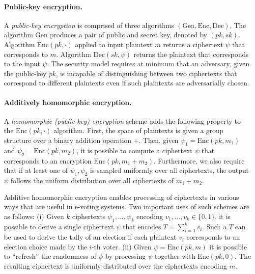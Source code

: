 \paragraph{Public-key encryption.} A \emph{public-key encryption} is
comprised of three algorithms
$(\mathrm{Gen},\mathrm{Enc}, \mathrm{Dec})$. The algorithm
$\mathrm{Gen}$ produces a pair of public and secret key, denoted by
$(pk,sk)$. Algorithm $\mathrm{Enc}(pk, \cdot )$ applied to input
plaintext $m$ returns a ciphertext $\psi$ that corresponds to $m$.
Algorithm $\mathrm{Dec}(sk, \psi )$ returns the plaintext that
corresponds to the input $\psi$. The security model requires at
minimum that an adversary, given the public-key $pk$, is incapable of
distinguishing between two ciphertexts that correspond to different
plaintexts even if such plaintexts are adversarially chosen.

\paragraph{Additively homomorphic encryption.} A \emph{homomorphic
  (public-key) encryption} scheme adds the following property to the
$\mathrm{Enc}(pk, \cdot)$ algorithm. First, the space of plaintexts is
given a group structure over a binary addition operation $+$. Then,
given $\psi_1 = \mathrm{Enc}(pk, m_1)$ and
$\psi_2 = \mathrm{Enc}(pk, m_2)$, it is possible to compute a
ciphertext $\psi$ that corresponds to an encryption
$\mathrm{Enc}(pk, m_1 + m_2)$. Furthermore, we also require that if at
least one of $\psi_1, \psi_2$ is sampled uniformly over all
ciphertexts, the output $\psi$ follows the uniform distribution over
all ciphertexts of $m_1 + m_2$.

Additive homomorphic encryption enables processing of ciphertexts in
various ways that are useful in e-voting systems. Two important uses
of such schemes are as follows: (i) Given $k$ ciphertexts
$\psi_1, \ldots, \psi_k$ encoding $v_1, \ldots, v_k \in \{0,1\}$, it
is possible to derive a single ciphertext $\psi$ that encodes
$T= \sum^k_{i=1} v_i$. Such a $T$ can be used to derive the tally of
an election if each plaintext $v_i$ corresponds to an election choice
made by the $i$-th voter. (ii) Given $\psi = \mathrm{Enc}(pk, m)$ it
is possible to ``refresh'' the randomness of $\psi$ by processing
$\psi$ together with $\mathrm{Enc}(pk, 0)$. The resulting ciphertext
is uniformly distributed over the ciphertexts encoding $m$.

